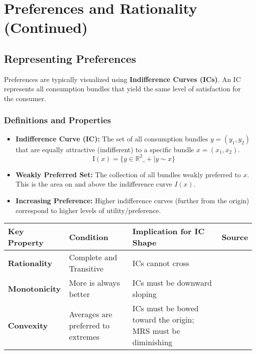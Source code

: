 \documentclass{article}
\begin{document}
\section{Preferences and Rationality (Continued)}

\subsection{Representing Preferences}

Preferences are typically visualized using \textbf{Indifference Curves (ICs)}. An IC represents all consumption bundles that yield the same level of satisfaction for the consumer.

\subsubsection*{Definitions and Properties}

\begin{itemize}
    \item \textbf{Indifference Curve (IC):} The set of all consumption bundles $y = (y_1, y_2)$ that are equally attractive (indifferent) to a specific bundle $x = (x_1, x_2)$. \[\text{I}(x) = \{y \in \mathbb{R}^2\_+ \mid y \sim x\}\]

    \item \textbf{Weakly Preferred Set:} The collection of all bundles weakly preferred to $x$. This is the area on and above the indifference curve $I(x)$.

    \item \textbf{Increasing Preference:} Higher indifference curves (further from the origin) correspond to higher levels of utility/preference.
\end{itemize}

\begin{center}
    \begin{tabular}{llll}
        \toprule
        Key Property & Condition & Implication for IC Shape & Source \\
        \midrule
        \textbf{Rationality} & Complete and Transitive & ICs cannot cross & \\
        \textbf{Monotonicity} & More is always better & ICs must be downward sloping & \\
        \textbf{Convexity} & Averages are preferred to extremes & ICs must be bowed toward the origin; MRS must be diminishing & \\
        \bottomrule
    
\end{tabular}

\end{center}
\end{document}
